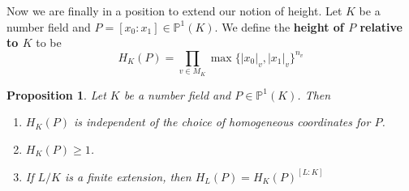 \documentclass{amsart}
\newtheorem{prop}[thm]{Proposition}
\renewcommand{\P}{\mathbb{P}}
\begin{document}
Now we are finally in a position to extend our notion of height. Let $K$ be a number field and $P = [x_0:x_1] \in \P^1(K)$. We define the \textbf{height of $P$ relative to $K$} to be $$H_K(P) = \prod_{v \in M_K}\max\{|x_0|_{v}, |x_1|_{v}\}^{n_{v}}$$

\begin{prop}
Let $K$ be a number field and $P \in \P^1(K)$. Then 

\begin{enumerate}
\item $H_K(P)$ is independent of the choice of homogeneous coordinates for $P$. 

\item $H_K(P) \geq 1$.

\item If $L/K$ is a finite extension, then $H_L(P) = H_K(P)^{[L:K]}$

\end{enumerate}
\end{prop}
\end{document}
